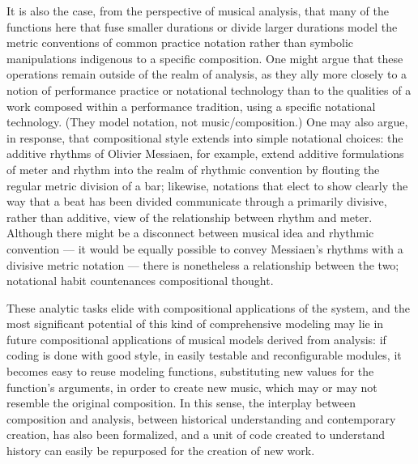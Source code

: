 It is also the case, from the perspective of musical analysis, that many of the functions here that fuse smaller durations or divide larger durations model the metric conventions of common practice notation rather than symbolic manipulations indigenous to a specific composition. One might argue that these operations remain outside of the realm of analysis, as they ally more closely to a notion of performance practice or notational technology than to the qualities of a work composed within a performance tradition, using a specific notational technology. (They model notation, not music/composition.) One may also argue, in response, that compositional style extends into simple notational choices: the additive rhythms of Olivier Messiaen, for example, extend additive formulations of meter and rhythm into the realm of rhythmic convention by flouting the regular metric division of a bar; likewise, notations that elect to show clearly the way that a beat has been divided communicate through a primarily divisive, rather than additive, view of the relationship between rhythm and meter. Although there might be a disconnect between musical idea and rhythmic convention --- it would be equally possible to convey Messiaen's rhythms with a divisive metric notation --- there is nonetheless a relationship between the two; notational habit countenances compositional thought.

These analytic tasks elide with compositional applications of the system, and the most significant potential of this kind of comprehensive modeling may lie in future compositional applications of musical models derived from analysis: if coding is done with good style, in easily testable and reconfigurable modules, it becomes easy to reuse modeling functions, substituting new values for the function's arguments, in order to create new music, which may or may not resemble the original composition. In this sense, the interplay between composition and analysis, between historical understanding and contemporary creation, has also been formalized, and a unit of code created to understand history can easily be repurposed for the creation of new work.
